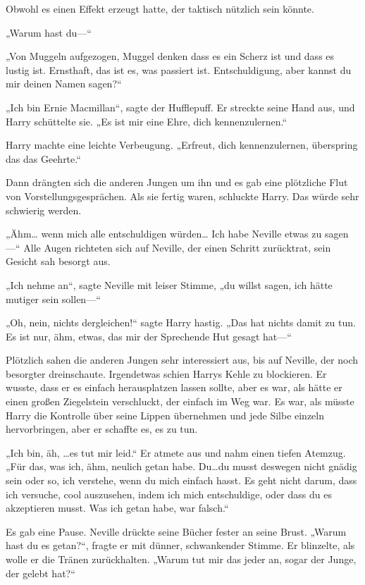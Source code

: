 {Obwohl es einen Effekt erzeugt hatte, der taktisch nützlich sein könnte.

„Warum hast du—“

„Von Muggeln aufgezogen, Muggel denken dass es ein Scherz ist und dass es lustig ist. Ernsthaft, das ist es, was passiert ist. Entschuldigung, aber kannst du mir deinen Namen sagen?“

„Ich bin Ernie Macmillan“, sagte der Hufflepuff. Er streckte seine Hand aus, und Harry schüttelte sie. „Es ist mir eine Ehre, dich kennenzulernen.“

Harry machte eine leichte Verbeugung. „Erfreut, dich kennenzulernen, überspring das das Geehrte.“

Dann drängten sich die anderen Jungen um ihn und es gab eine plötzliche Flut von Vorstellungsgesprächen. Als sie fertig waren, schluckte Harry. Das würde sehr schwierig werden.

„Ähm… wenn mich alle entschuldigen würden… Ich habe Neville etwas zu sagen—“ Alle Augen richteten sich auf Neville, der einen Schritt zurücktrat, sein Gesicht sah besorgt aus.

„Ich nehme an“, sagte Neville mit leiser Stimme, „du willst sagen, ich hätte mutiger sein sollen—“

„Oh, nein, nichts dergleichen!“ sagte Harry hastig. „Das hat nichts damit zu tun. Es ist nur, ähm, etwas, das mir der Sprechende Hut gesagt hat—“

Plötzlich sahen die anderen Jungen sehr interessiert aus, bis auf Neville, der noch besorgter dreinschaute. Irgendetwas schien Harrys Kehle zu blockieren. Er wusste, dass er es einfach herausplatzen lassen sollte, aber es war, als hätte er einen großen Ziegelstein verschluckt, der einfach im Weg war. Es war, als müsste Harry die Kontrolle über seine Lippen übernehmen und jede Silbe einzeln hervorbringen, aber er schaffte es, es zu tun.

„Ich bin, äh, …es tut mir leid.“ Er atmete aus und nahm einen tiefen Atemzug. „Für das, was ich, ähm, neulich getan habe. Du…du musst deswegen nicht gnädig sein oder so, ich verstehe, wenn du mich einfach hasst. Es geht nicht darum, dass ich versuche, cool auszusehen, indem ich mich entschuldige, oder dass du es akzeptieren musst. Was ich getan habe, war falsch.“

Es gab eine Pause. Neville drückte seine Bücher fester an seine Brust. „Warum hast du es getan?“, fragte er mit dünner, schwankender Stimme. Er blinzelte, als wolle er die Tränen zurückhalten. „Warum tut mir das jeder an, sogar der Junge, der gelebt hat?“

}
